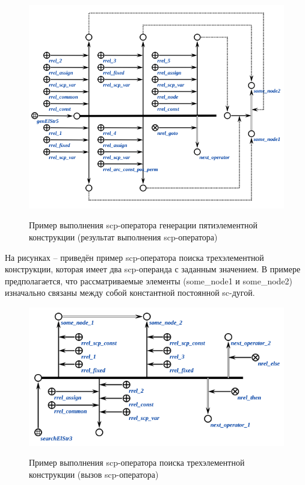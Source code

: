 \begin{figure}[H]
	\centering
	\caption{Пример выполнения scp-оператора генерации пятиэлементной конструкции (результат выполнения scp-оператора)}
	\includegraphics[scale=0.8]{images/part3/chapter_situation_management/genElStr5_fafaa_2.png}
	\label{fig:genElStr5_fafaa_2}
\end{figure}

На рисунках \textit{} -- \textit{} приведён пример scp-оператора поиска трехэлементной конструкции, которая имеет два scp-операнда с заданным значением. В примере предполагается, что рассматриваемые элементы (some\_node1 и some\_node2) изначально связаны между собой константной постоянной sc-дугой.

\begin{figure}[H]
	\centering
	\caption{Пример выполнения scp-оператора поиска трехэлементной конструкции (вызов scp-оператора)}
	\includegraphics[scale=0.8]{images/part3/chapter_situation_management/searchElStr3_faf.png}
	\label{fig:searchElStr3_faf}
\end{figure}

